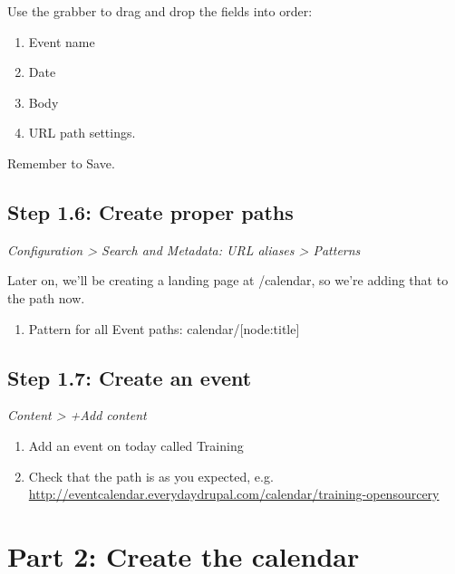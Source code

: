 \documentclass[letterpaper,10pt,english]{sphinxmanual}
\begin{document}
Use the grabber to drag and drop the fields into order:
\begin{enumerate}
\item {} 
Event name

\item {} 
Date

\item {} 
Body

\item {} 
URL path settings.

\end{enumerate}

Remember to Save.


\section{Step 1.6: Create proper paths}
\label{event_calendar:step-1-6-create-proper-paths}
\emph{Configuration \textgreater{} Search and Metadata: URL aliases \textgreater{} Patterns}

Later on, we'll be creating a landing page at /calendar, so we're adding that to the path now.
\begin{enumerate}
\item {} 
Pattern for all Event paths: calendar/{[}node:title{]}

\end{enumerate}


\section{Step 1.7: Create an event}
\label{event_calendar:step-1-7-create-an-event}
\emph{Content \textgreater{} +Add content}
\begin{enumerate}
\item {} 
Add an event on today called Training

\item {} 
Check that the path is as you expected, e.g. \href{http://eventcalendar.everydaydrupal.com/calendar/training-opensourcery}{http://eventcalendar.everydaydrupal.com/calendar/training-opensourcery}

\end{enumerate}


\chapter{Part 2: Create the calendar}
\label{event_calendar:part-2-create-the-calendar}
\end{document}
